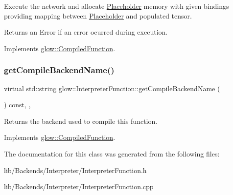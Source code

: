 Execute the network and allocate \hyperlink{classglow_1_1_placeholder}{Placeholder} memory with given {\ttfamily bindings} providing mapping between \hyperlink{classglow_1_1_placeholder}{Placeholder} and populated tensor. \begin{DoxyReturn}{Returns}
an Error if an error ocurred during execution. 
\end{DoxyReturn}


Implements \hyperlink{classglow_1_1_compiled_function_ac8dd94f2ee7129a435f1701b6a9f419e}{glow\+::\+Compiled\+Function}.

\mbox{\label{classglow_1_1_interpreter_function_a7fe37f3e6fe47a7806ecc1cb6d05b2c2}} 
\subsubsection{\texorpdfstring{get\+Compile\+Backend\+Name()}{getCompileBackendName()}}
{\footnotesize\ttfamily virtual std\+::string glow\+::\+Interpreter\+Function\+::get\+Compile\+Backend\+Name (\begin{DoxyParamCaption}{ }\end{DoxyParamCaption}) const\hspace{0.3cm}{\ttfamily [inline]}, {\ttfamily [override]}, {\ttfamily [virtual]}}

\begin{DoxyReturn}{Returns}
the backend used to compile this function. 
\end{DoxyReturn}


Implements \hyperlink{classglow_1_1_compiled_function_a7b3f2b17986d14706a1d1091d3c4df27}{glow\+::\+Compiled\+Function}.



The documentation for this class was generated from the following files\+:\begin{DoxyCompactItemize}
\item 
lib/\+Backends/\+Interpreter/Interpreter\+Function.\+h\item 
lib/\+Backends/\+Interpreter/Interpreter\+Function.\+cpp\end{DoxyCompactItemize}
